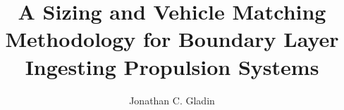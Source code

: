 \documentclass[12pt]{gatech-thesis}
\title{A Sizing and Vehicle Matching Methodology for Boundary Layer Ingesting Propulsion Systems} %
\author{Jonathan C. Gladin}
\begin{document}
	
	
	
	\begin{preliminary}
	
		

		

		
	
		

		\contents
		
		

	\end{preliminary}

	

		

		

	

	

	

	

\nocite{*}
 
\begin{postliminary}
\end{postliminary}
\end{document}

